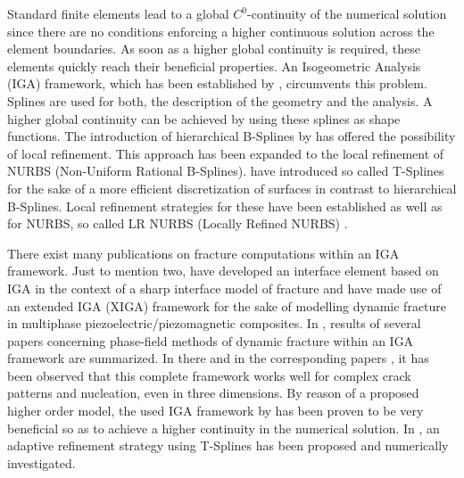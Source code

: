 Standard finite elements lead to a global $C^{0}$-continuity of the numerical solution since there are no conditions enforcing a higher continuous solution across the element boundaries. As soon as a higher global continuity is required, these elements quickly reach their beneficial properties. An Isogeometric Analysis (IGA) framework, which has been established by \citet{09_B_IGA1}, circumvents this problem. Splines are used for both, the description of the geometry and the analysis. A higher global continuity can be achieved by using these splines as shape functions. The introduction of hierarchical B-Splines by \citet{18_IGA_HierBSplines} has offered the possibility of local refinement. This approach has been expanded to the local refinement of NURBS (Non-Uniform Rational B-Splines). \citet{16_IGA_TSplines} have introduced so called T-Splines for the sake of a more efficient discretization of surfaces in contrast to hierarchical B-Splines. Local refinement strategies for these have been established as well as for NURBS, so called LR NURBS (Locally Refined NURBS) \cite{17_IGA_LRNURBS}.

There exist many publications on fracture computations within an IGA framework. Just to mention two, \citet{19_B_FracIGA1} have developed an interface element based on IGA in the context of a sharp interface model of fracture and \citet{20_B_FracIGA2} have made use of an extended IGA (XIGA) framework for the sake of modelling dynamic fracture in multiphase piezoelectric/piezomagnetic composites. In \cite{11_PF_DissBorden}, results of several papers concerning phase-field methods of dynamic fracture within an IGA framework are summarized. In there and in the corresponding papers \cite{03_PF_ductile}\cite{02_PF_HO_brittle}\cite{01_PF_dyn_brittle}, it has been observed that this complete framework works well for complex crack patterns and nucleation, even in three dimensions. By reason of a proposed higher order model, the used IGA framework by \citet{09_B_IGA1} has been proven to be very beneficial so as to achieve a higher continuity in the numerical solution. In \cite{01_PF_dyn_brittle}, an adaptive refinement strategy using T-Splines has been proposed and numerically investigated.

